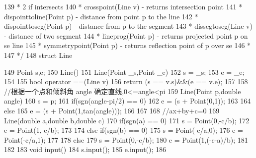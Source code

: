 \documentclass[11pt]{article}
\begin{document}
\begin{Code}
139    *                                   2 if intersects
140    * crosspoint(Line v)              - returns intersection point
141    * dispointtoline(Point p)         - distance from point p to the
          line
142    * dispointtoseg(Point p)          - distance from p to the segment
143    * dissegtoseg(Line v)             - distance of two segment
144    * lineprog(Point p)               - returns projected point p on se
           line
145    * symmetrypoint(Point p)          - returns reflection point of p
          over se
146    *
147    */
148   struct Line{
149       Point s,e;
150       Line(){}
151       Line(Point _s,Point _e){
152            s = _s;
153            e = _e;
154       }
155       bool operator ==(Line v){
156            return (s == v.s)&&(e == v.e);
157       }
158       //根据一个点和倾斜角 angle 确定直线,0<=angle<pi
159       Line(Point p,double angle){
160            s = p;
161            if(sgn(angle-pi/2) == 0){
162                e = (s + Point(0,1));
163            }
164            else{
165                e = (s + Point(1,tan(angle)));
166            }
167       }
168       //ax+by+c=0
169       Line(double a,double b,double c){
170            if(sgn(a) == 0){
171                s = Point(0,-c/b);
172                e = Point(1,-c/b);
173            }
174            else if(sgn(b) == 0){
175                s = Point(-c/a,0);
176                e = Point(-c/a,1);
177            }
178            else{
179                s = Point(0,-c/b);
180                e = Point(1,(-c-a)/b);
181            }
182       }
183       void input(){
184            s.input();
185            e.input();
186       }


}
\end{Code}
\end{document}
